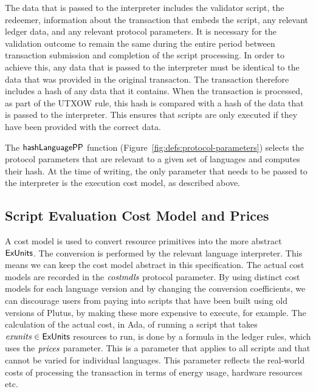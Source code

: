 The data that is passed to the interpreter
includes the validator script, the redeemer, information about the transaction that
embeds the script, any relevant ledger data, and any relevant protocol parameters.
It is necessary for the validation outcome  to remain the same during the entire
period between transaction
submission and completion of the script processing.
%
In order to achieve this,
any data that is passed to the interpreter must be
identical to the data that was provided in the original transacton.
The transaction therefore includes a hash of any data that it contains.
When the transaction is processed, as part of the UTXOW rule, this hash is compared with a hash of the  data that is passed to the interpreter. This
ensures that scripts are only executed if they have been provided with the correct data.

The $\mathsf{hashLanguagePP}$ function (Figure~\ref{fig:defs:protocol-parameters}) selects the protocol parameters that are relevant to
a given set of languages and computes their hash.
%
At the time of writing, the only parameter that needs to be passed to the interpreter is the execution cost model, as described above.

\subsection{Script Evaluation Cost Model and Prices}
\label{sec:cost-mod}

A cost model is used to convert resource primitives into the
more abstract $\mathsf{ExUnits}$.
The conversion is performed by the relevant language interpreter.
This means we can keep the cost model abstract in this specification.
The actual cost models are recorded in the  $\mathit{costmdls}$ protocol parameter.
%
By using distinct cost models for each language version and by changing the conversion coefficients, we can discourage users from
paying into scripts that have been built using old versions of Plutus, by making these more expensive to execute, for example.
%
The calculation of the actual cost, in Ada, of running
a script that takes $\mathit{exunits} \in \mathsf{ExUnits}$ resources to run,
is done by a formula in the ledger rules, which uses the
$\mathit{prices}$ parameter. This is a parameter that applies to all
scripts and that cannot be varied for individual languages. This parameter
reflects the real-world costs of processing the transaction in terms of energy usage, hardware resources etc.

